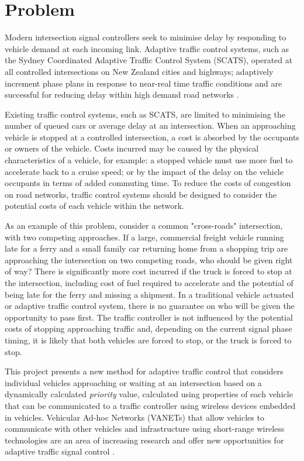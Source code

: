 \section{Problem}

Modern intersection signal controllers seek to minimise delay by responding to vehicle demand at each incoming link. Adaptive traffic control systems, such as the Sydney Coordinated Adaptive Traffic Control System (SCATS), operated at all controlled intersections on New Zealand cities and highways; adaptively increment phase plans in response to near-real time traffic conditions and are successful for reducing delay within high demand road networks \cite{lowrie1982scats,akcelik1998evaluation,wolshon1999scats}.

Existing traffic control systems, such as SCATS, are limited to minimising the number of queued cars or average delay at an intersection. When an approaching vehicle is stopped at a controlled intersection, a cost is absorbed by the occupants or owners of the vehicle. Costs incurred may be caused by the physical characteristics of a vehicle, for example: a stopped vehicle must use more fuel to accelerate back to a cruise speed; or by the impact of the delay on the vehicle occupants in terms of added commuting time. To reduce the costs of congestion on road networks, traffic control systems should be designed to consider the potential costs of each vehicle within the network.

As an example of this problem, consider a common "cross-roads" intersection, with two competing approaches. If a large, commercial freight vehicle running late for a ferry and a small family car returning home from a shopping trip are approaching the intersection on two competing roads, who should be given right of way? There is significantly more cost incurred if the truck is forced to stop at the intersection, including cost of fuel required to accelerate and the potential of being late for the ferry and missing a shipment. In a traditional vehicle actuated or adaptive traffic control system, there is no guarantee on who will be given the opportunity to pass first. The traffic controller is not influenced by the potential costs of stopping approaching traffic and, depending on the current signal phase timing, it is likely that both vehicles are forced to stop, or the truck is forced to stop. 

This project presents a new method for adaptive traffic control that considers individual vehicles approaching or waiting at an intersection based on a dynamically calculated \emph{priority} value, calculated using properties of each vehicle that can be communicated to a traffic controller using wireless devices embedded in vehicles. Vehicular Ad-hoc Networks (VANETs) that allow vehicles to communicate with other vehicles and infrastructure using short-range wireless technologies are an area of increasing research and offer new opportunities for adaptive traffic signal control \cite{adaptive2007grad,nadeem2004trafficview,yang2004vehicle}.

